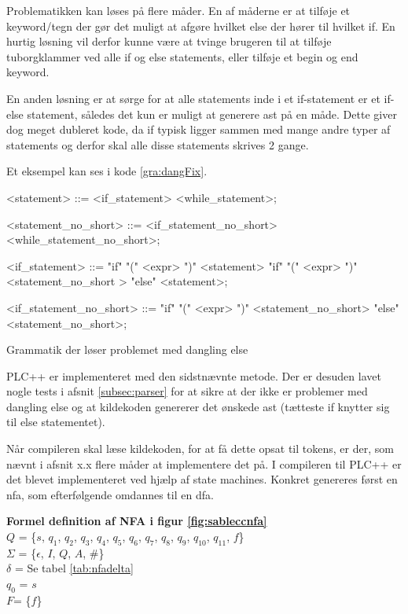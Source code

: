 Problematikken kan løses på flere måder. En af måderne er at tilføje et keyword/tegn der gør det muligt at afgøre hvilket else der hører til hvilket if. En hurtig løsning vil derfor kunne være at tvinge brugeren til at tilføje tuborgklammer ved alle if og else statements, eller tilføje et begin og end keyword.

En anden løsning er at sørge for at alle statements inde i et if-statement er et if-else statement, således det kun er muligt at generere \gls{ast} på en måde. Dette giver dog meget dubleret kode, da if typisk ligger sammen med mange andre typer af statements og derfor skal alle disse statements skrives 2 gange.

Et eksempel kan ses i kode \ref{gra:dangFix}.

\begin{Grammar}
 \begin{grammar}
    <statement> ::= <if\_statement>
    \alt <while\_statement>;
    
    <statement\_no\_short> ::= <if\_statement\_no\_short>
    \alt <while\_statement\_no\_short>;
    
    <if\_statement> ::= "if" "(" <expr> ")" <statement> 
    \alt"if" "(" <expr> ")" <statement\_no\_short > "else" <statement>;
    
    <if\_statement\_no\_short> ::= "if" "(" <expr> ")" <statement\_no\_short> "else" <statement\_no\_short>;
 \end{grammar}
 \caption{Grammatik der løser problemet med dangling else}\label{gra:dangFix}
\end{Grammar}

PLC++ er implementeret med den sidstnævnte metode. Der er desuden lavet nogle tests i afsnit \ref{subsec:parser} for at sikre at der ikke er problemer med dangling else og at kildekoden genererer det ønskede \gls{ast} (tætteste if knytter sig til else statementet).

\noindent Når compileren skal læse kildekoden, for at få dette opsat til tokens, er der, som nævnt i afsnit x.x flere måder at implementere det på. I compileren til PLC++ er det blevet implementeret ved hjælp af state machines. Konkret genereres først en \gls{nfa}, som efterfølgende omdannes til en \gls{dfa}.


\noindent \textbf{Formel definition af NFA i figur \ref{fig:sableccnfa}}\\
\noindent $Q$ = \{$s$, $q_1$, $q_2$, $q_3$, $q_4$, $q_5$, $q_6$, $q_7$, $q_8$, $q_9$, $q_{10}$, $q_{11}$, $f$\}\\
\noindent $\Sigma$ = \{$\epsilon$, $I$, $Q$, $A$, $\#$\}\\
\noindent $\delta$ = Se tabel \ref{tab:nfadelta}\\
\noindent $q_0$ = $s$\\
\noindent $F$= \{$f$\}\\


